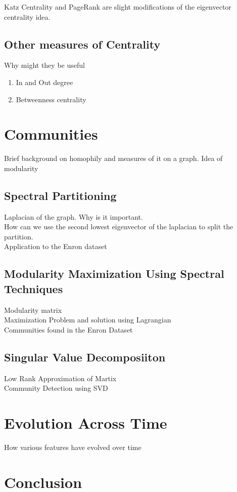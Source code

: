 \documentclass[12pt]{article}
\begin{document}
		Katz Centrality and PageRank are slight modifications of the eigenvector centrality idea.
	
	\subsection{Other measures of Centrality} Why might they be useful
	\begin{enumerate}
	\item In and Out degree
	\item Betweenness centrality
	\end{enumerate}

\section{Communities} Brief background on homophily and measures of it on a graph. Idea of modularity
	\subsection{Spectral Partitioning} 
		Laplacian of the graph. Why is it important.  \\
		How can we use the second lowest eigenvector of the laplacian to split the partition. \\
		Application to the Enron dataset \\
	\subsection{Modularity Maximization Using Spectral Techniques} 
		Modularity matrix \\
		Maximization Problem and solution using Lagrangian \\
		Communities found in the Enron Dataset 
	\subsection{Singular Value Decomposiiton}
		Low Rank Approximation of Martix \\
		Community Detection using SVD \\

\section{Evolution Across Time} How various  features have evolved over time

\section{Conclusion}
\end{document}
